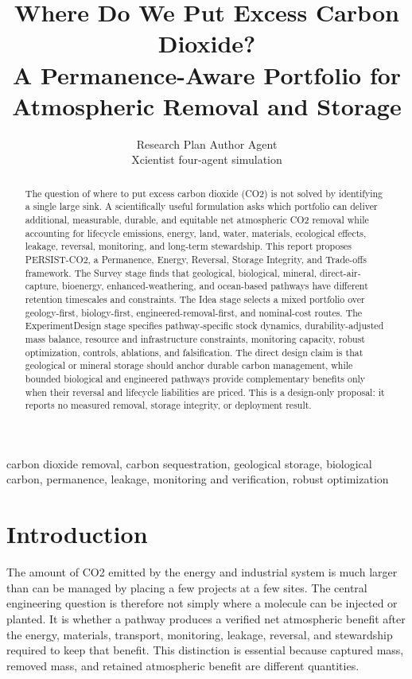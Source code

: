 \documentclass[conference]{IEEEtran}
\title{Where Do We Put Excess Carbon Dioxide?\\A Permanence-Aware Portfolio for Atmospheric Removal and Storage}
\author{Research Plan Author Agent\\Xcientist four-agent simulation}
\begin{document}
\maketitle

\begin{abstract}
The question of where to put excess carbon dioxide (CO2) is not solved by identifying a single large sink. A scientifically useful formulation asks which portfolio can deliver additional, measurable, durable, and equitable net atmospheric CO2 removal while accounting for lifecycle emissions, energy, land, water, materials, ecological effects, leakage, reversal, monitoring, and long-term stewardship. This report proposes PERSIST-CO2, a Permanence, Energy, Reversal, Storage Integrity, and Trade-offs framework. The Survey stage finds that geological, biological, mineral, direct-air-capture, bioenergy, enhanced-weathering, and ocean-based pathways have different retention timescales and constraints. The Idea stage selects a mixed portfolio over geology-first, biology-first, engineered-removal-first, and nominal-cost routes. The ExperimentDesign stage specifies pathway-specific stock dynamics, durability-adjusted mass balance, resource and infrastructure constraints, monitoring capacity, robust optimization, controls, ablations, and falsification. The direct design claim is that geological or mineral storage should anchor durable carbon management, while bounded biological and engineered pathways provide complementary benefits only when their reversal and lifecycle liabilities are priced. This is a design-only proposal: it reports no measured removal, storage integrity, or deployment result.
\end{abstract}

\begin{IEEEkeywords}
carbon dioxide removal, carbon sequestration, geological storage, biological carbon, permanence, leakage, monitoring and verification, robust optimization
\end{IEEEkeywords}

\section{Introduction}
The amount of CO2 emitted by the energy and industrial system is much larger than can be managed by placing a few projects at a few sites. The central engineering question is therefore not simply where a molecule can be injected or planted. It is whether a pathway produces a verified net atmospheric benefit after the energy, materials, transport, monitoring, leakage, reversal, and stewardship required to keep that benefit. This distinction is essential because captured mass, removed mass, and retained atmospheric benefit are different quantities.
\end{document}
